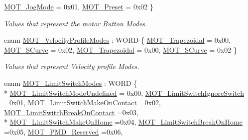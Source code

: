 \begin{DoxyCompactItemize}
\hyperlink{group___common_gga7cccb4c592f8aa2f869b5cd9f0b0e7f9ab71d573463b20821e5b42cf523c512be}{M\+O\+T\+\_\+\+Jog\+Mode} = 0x01, 
\hyperlink{group___common_gga7cccb4c592f8aa2f869b5cd9f0b0e7f9ac7c903649c2421d63f2def21b0fe2043}{M\+O\+T\+\_\+\+Preset} = 0x02
 \}\begin{DoxyCompactList}\small\item\em Values that represent the motor Button Modes. \end{DoxyCompactList}
\item 
enum \hyperlink{group___common_gaa69399e5492d572d7976b386dbcb3ffe}{M\+O\+T\+\_\+\+Velocity\+Profile\+Modes} \+: W\+O\+RD \{ \hyperlink{group___common_ggaa69399e5492d572d7976b386dbcb3ffeaef4a0a65efa2f222f26230b3bb4d2955}{M\+O\+T\+\_\+\+Trapezoidal} = 0x00, 
\hyperlink{group___common_ggaa69399e5492d572d7976b386dbcb3ffeaac0bce9cdce654090991ff0b76f89f27}{M\+O\+T\+\_\+\+S\+Curve} = 0x02, 
\hyperlink{group___common_ggaa69399e5492d572d7976b386dbcb3ffeaef4a0a65efa2f222f26230b3bb4d2955}{M\+O\+T\+\_\+\+Trapezoidal} = 0x00, 
\hyperlink{group___common_ggaa69399e5492d572d7976b386dbcb3ffeaac0bce9cdce654090991ff0b76f89f27}{M\+O\+T\+\_\+\+S\+Curve} = 0x02
 \}\begin{DoxyCompactList}\small\item\em Values that represent Velocity profile Modes. \end{DoxyCompactList}
\item 
enum \hyperlink{group___common_ga682c3ff98dc472fbdc3cbc3267d38796}{M\+O\+T\+\_\+\+Limit\+Switch\+Modes} \+: W\+O\+RD \{ \\*
\hyperlink{group___common_gga682c3ff98dc472fbdc3cbc3267d38796a5d1c87f59088fb4c61890ee9f7e396d8}{M\+O\+T\+\_\+\+Limit\+Switch\+Mode\+Undefined} = 0x00, 
\hyperlink{group___common_gga682c3ff98dc472fbdc3cbc3267d38796a4597f8cb8699917b05a17043355b6b4e}{M\+O\+T\+\_\+\+Limit\+Switch\+Ignore\+Switch} =0x01, 
\hyperlink{group___common_gga682c3ff98dc472fbdc3cbc3267d38796a71019889786145d78d206ebfe8532582}{M\+O\+T\+\_\+\+Limit\+Switch\+Make\+On\+Contact} =0x02, 
\hyperlink{group___common_gga682c3ff98dc472fbdc3cbc3267d38796a8ede426a957ea9aaccb56eb9fbdd65f3}{M\+O\+T\+\_\+\+Limit\+Switch\+Break\+On\+Contact} =0x03, 
\\*
\hyperlink{group___common_gga682c3ff98dc472fbdc3cbc3267d38796a6befefb68076e7c2ebd3a3174857d814}{M\+O\+T\+\_\+\+Limit\+Switch\+Make\+On\+Home} =0x04, 
\hyperlink{group___common_gga682c3ff98dc472fbdc3cbc3267d38796a0f7d30a1b18750e5d8d959c05ff16815}{M\+O\+T\+\_\+\+Limit\+Switch\+Break\+On\+Home} =0x05, 
\hyperlink{group___common_gga682c3ff98dc472fbdc3cbc3267d38796a4da0cb79d5cc0720c05912f0341b9365}{M\+O\+T\+\_\+\+P\+M\+D\+\_\+\+Reserved} =0x06, 

\end{DoxyCompactItemize}
